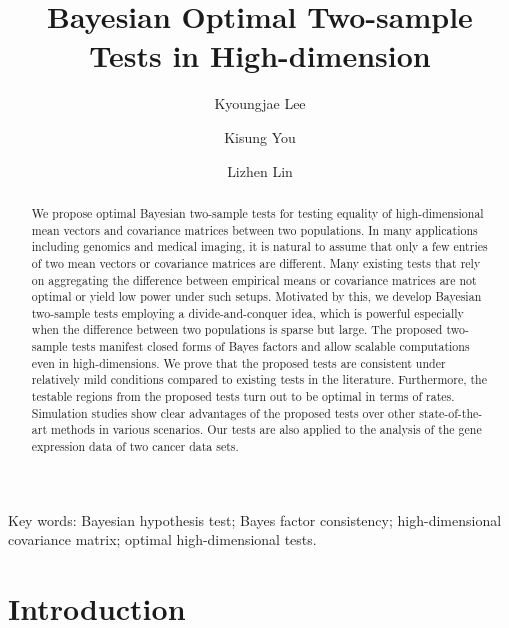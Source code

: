 \documentclass[11pt]{article}
\begin{document}
\title{Bayesian Optimal Two-sample Tests in High-dimension}
\author[1]{Kyoungjae Lee}
\author[2]{Kisung You}
\author[3]{Lizhen Lin}

\maketitle
\begin{abstract}
	We propose optimal Bayesian two-sample tests for testing equality of high-dimensional mean vectors and covariance matrices between two populations.
	In many applications including genomics and medical imaging,  it is natural  to assume that only a few entries of two mean vectors or covariance matrices are different. Many existing tests that rely on aggregating the difference between empirical means or covariance matrices are not optimal or  yield low power under such  setups.
	Motivated by this, we develop Bayesian two-sample tests employing a divide-and-conquer idea, which is powerful especially when the difference between two populations is sparse but large.
	The proposed two-sample tests manifest closed forms of Bayes factors and allow scalable computations even in high-dimensions.
	We prove that the proposed tests are consistent under relatively mild conditions compared to existing tests in the literature.
	Furthermore,  the testable regions from the proposed tests turn out to be optimal in terms of rates.
	Simulation studies show clear advantages of the proposed tests over other state-of-the-art methods in various scenarios. Our tests are also applied to the analysis of the gene expression data of two cancer data sets. 
\end{abstract}

Key words: Bayesian hypothesis test; 
Bayes factor consistency; 
high-dimensional covariance matrix; 
optimal high-dimensional tests.

\section{Introduction}\label{sec:intro}
\end{document}
